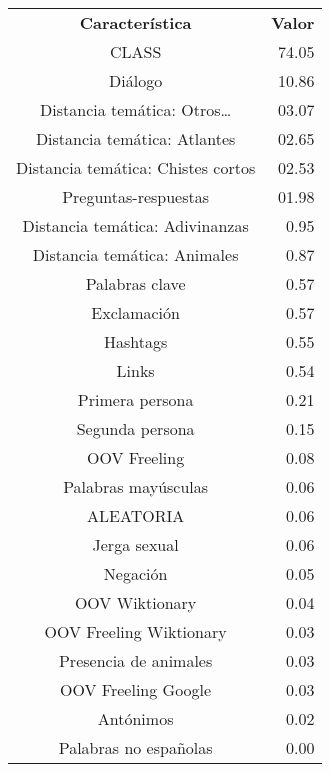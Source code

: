 \begin{frame}[allowframebreaks]
    \begin{center}
        \tiny
        \begin{tabular}{ c r }
            \multicolumn{1}{c}{\textbf{Característica}} & \multicolumn{1}{c}{\textbf{Valor}} \\
            CLASS & 74.05 \\
            Diálogo & 10.86 \\
            Distancia temática: Otros\ldots & 03.07 \\
            Distancia temática: Atlantes & 02.65 \\
            Distancia temática: Chistes cortos & 02.53 \\
            Preguntas-respuestas & 01.98 \\
            Distancia temática: Adivinanzas & 0.95 \\
            Distancia temática: Animales & 0.87 \\
            Palabras clave & 0.57 \\
            Exclamación & 0.57 \\
            Hashtags & 0.55 \\
            Links & 0.54 \\
            Primera persona & 0.21 \\
            Segunda persona & 0.15 \\
            OOV Freeling & 0.08 \\
            Palabras mayúsculas & 0.06 \\
            ALEATORIA & 0.06 \\
            Jerga sexual & 0.06 \\
            Negación & 0.05 \\
            OOV Wiktionary & 0.04 \\
            OOV Freeling Wiktionary & 0.03 \\
            Presencia de animales & 0.03 \\
            OOV Freeling Google & 0.03 \\
            Antónimos & 0.02 \\
            Palabras no españolas & 0.00 \\
        \end{tabular}
    \end{center}

\end{frame}
